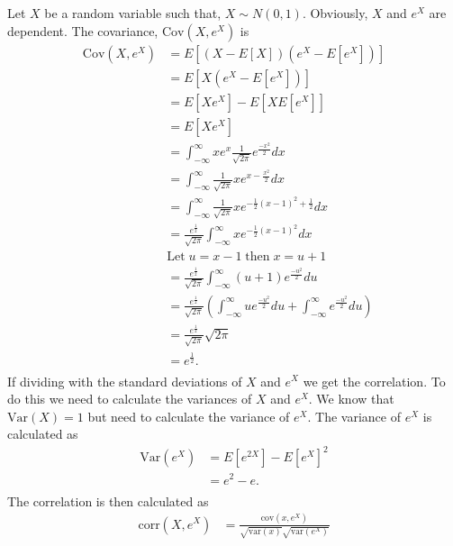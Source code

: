 \begin{example}
    Let $X$ be a random variable such that, $X \sim N(0,1)$. Obviously, $X$ and $e^X$ are dependent. The covariance, $\mathrm{Cov}(X,e^X)$ is
    \begin{align*}
        \mathrm{Cov}(X,e^X) &= E \left[  (X-E\left[  X \right])(e^X-E\left[  e^X \right])  \right]\\
         &=  E \left[  X(e^X-E\left[  e^X \right]) \right]\\
         &= E \left[  Xe^X  \right] - E \left[  X E \left[  e^X \right] \right]\\
         &= E \left[  Xe^X  \right]\\
         &= \int_{-\infty}^\infty xe^x \frac{1}{\sqrt{2\pi}} e^{\frac{-x^2}{2}} dx\\ %
         &=  \int_{-\infty}^\infty \frac{1}{\sqrt{2\pi}} x  e^{x -\frac{x^2}{2}} dx \\
         &= \int_{-\infty}^\infty \frac{1}{\sqrt{2\pi}} x  e^{-\frac{1}{2}(x-1)^2+\frac{1}{2} } dx \\
         &= \frac{e^\frac{1}{2}}{\sqrt{2\pi}}\int_{-\infty}^\infty x  e^{-\frac{1}{2}(x-1)^2 } dx\\
         & \mathrm{Let\;} u = x-1 \; \mathrm{then\;} x = u+1\\
         &= \frac{e^\frac{1}{2}}{\sqrt{2\pi}}\int_{-\infty}^\infty (u+1)e^{\frac{-u^2}{2}} du\\
         &= \frac{e^\frac{1}{2}}{\sqrt{2\pi}} \left( \int_{-\infty}^\infty ue^{\frac{-u^2}{2}}du +\int_{-\infty}^\infty e^{\frac{-u^2}{2}} du  \right) \\
         &= \frac{e^\frac{1}{2}}{\sqrt{2\pi}}\sqrt{2\pi}   \\
         &= e^{\frac{1}{2}}.\\
    \end{align*}
    If dividing with the standard deviations of $X$ and $e^X$ we get the correlation. To do this we need to calculate the variances of $X$ and $e^X$. We know that $\mathrm{Var}(X) = 1$ but need to calculate the variance of $e^X$. The variance of $e^X$ is calculated as
    \begin{align*}
        \mathrm{Var}(e^X) &= E[e^{2X}] - E[e^X]^2\\
        &= e^2 - e.\\
    \end{align*}
    The correlation is then calculated as
    \begin{align*}
        \mathrm{corr}(X,e^X) &= \frac{\mathrm{cov}(x,e^X)}{\sqrt{\mathrm{var}(x)} \sqrt{\mathrm{var}(e^X)}}\\

\end{align*}
\end{example}
